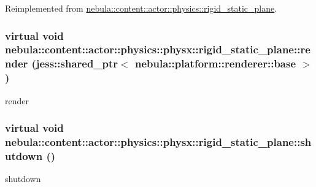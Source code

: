 Reimplemented from \hyperlink{classnebula_1_1content_1_1actor_1_1physics_1_1rigid__static__plane_a507d6d75754916f23d673205d53b3874}{nebula::content::actor::physics::rigid\_\-static\_\-plane}.\hypertarget{classnebula_1_1content_1_1actor_1_1physics_1_1physx_1_1rigid__static__plane_a5a8ac2e89cea0594bb1d68fbc038c32a}{
\subsubsection[{render}]{\setlength{\rightskip}{0pt plus 5cm}virtual void nebula::content::actor::physics::physx::rigid\_\-static\_\-plane::render (jess::shared\_\-ptr$<$ {\bf nebula::platform::renderer::base} $>$)}}
\label{classnebula_1_1content_1_1actor_1_1physics_1_1physx_1_1rigid__static__plane_a5a8ac2e89cea0594bb1d68fbc038c32a}


render \hypertarget{classnebula_1_1content_1_1actor_1_1physics_1_1physx_1_1rigid__static__plane_ac700d7dbdea733b24b1088cc0c78a6a6}{
\subsubsection[{shutdown}]{\setlength{\rightskip}{0pt plus 5cm}virtual void nebula::content::actor::physics::physx::rigid\_\-static\_\-plane::shutdown ()}}
\label{classnebula_1_1content_1_1actor_1_1physics_1_1physx_1_1rigid__static__plane_ac700d7dbdea733b24b1088cc0c78a6a6}


shutdown 

